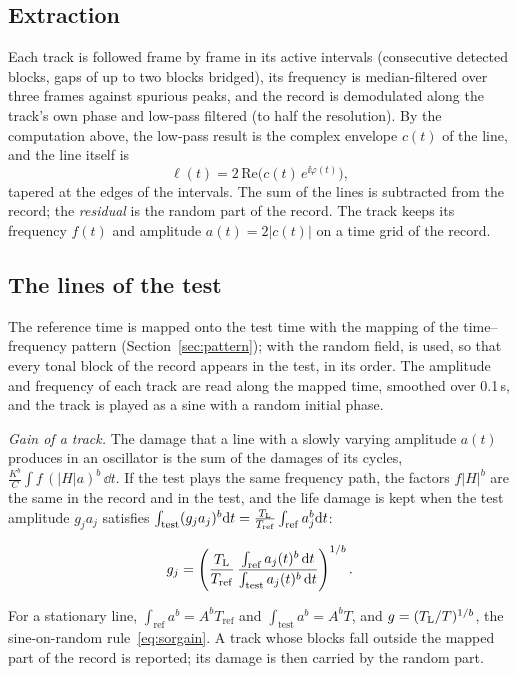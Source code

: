 \subsection{Extraction}

Each track is followed frame by frame in its active intervals (consecutive detected blocks, gaps of up
to two blocks bridged), its frequency is median-filtered over three frames against spurious peaks,
and the record is demodulated along the track's own phase and low-pass filtered (to half the
resolution). By the computation above, the low-pass result is the complex envelope $c(t)$ of the line,
and the line itself is
\begin{equation}
  \ell(t) = 2\,\mathrm{Re}\bigl(c(t)\,e^{\ii\varphi(t)}\bigr),
\end{equation}
tapered at the edges of the intervals. The sum of the lines is subtracted from the record; the
\emph{residual} is the random part of the record. The track keeps its frequency $f(t)$ and amplitude
$a(t) = 2|c(t)|$ on a time grid of the record.

\subsection{The lines of the test}\label{sec:testlines}

The reference time is mapped onto the test time with the mapping of the time--frequency pattern
(Section~\ref{sec:pattern}); with the random field,  is used, so that every tonal block
of the record appears in the test, in its order. The amplitude and frequency of each track are read
along the mapped time, smoothed over 0.1\,s, and the track is played as a sine with a random initial
phase.

\emph{Gain of a track.} The damage that a line with a slowly varying amplitude $a(t)$ produces in an
oscillator is the sum of the damages of its cycles, $\frac{K^b}{C}\int f\,(|H|a)^b\,\dd t$. If the
test plays the same frequency path, the factors $f|H|^b$ are the same in the record and in the test,
and the life damage is kept when the test amplitude $g_ja_j$ satisfies
$\int_{\mathrm{test}}(g_ja_j)^b\mathrm{d} t = \frac{T_{\mathrm{L}}}{T_{\mathrm{ref}}}\int_{\mathrm{ref}}a_j^b\mathrm{d} t$:
\begin{result}
\begin{equation}
  g_j = \left(\frac{T_{\mathrm{L}}}{T_{\mathrm{ref}}}\,\frac{\int_{\mathrm{ref}}a_j(t)^b\,\mathrm{d} t}{\int_{\mathrm{test}}a_j(t)^b\,\mathrm{d} t}\right)^{1/b}.
\end{equation}
\end{result}
For a stationary line, $\int_{\mathrm{ref}}a^b = A^bT_{\mathrm{ref}}$ and $\int_{\mathrm{test}}a^b = A^bT$,
and $g = (T_{\mathrm{L}}/T)^{1/b}$, the sine-on-random rule~\eqref{eq:sorgain}. A track whose blocks fall outside
the mapped part of the record is reported; its damage is then carried by the random part.

